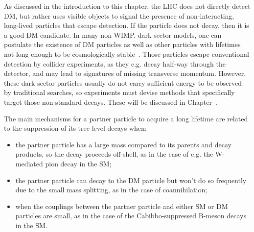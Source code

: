 As discussed in the introduction to this chapter, the LHC does not directly detect DM, but rather uses visible objects to signal the presence of non-interacting, long-lived particles that escape detection. If the particle does not decay, then it is a good DM candidate. In many non-WIMP, dark sector models, one can postulate the existence of DM particles as well as other particles with lifetimes not long enough to be cosmologically stable~\cite{Strassler:2006im}. Those particles escape conventional detection by collider experiments, as they e.g. decay half-way through the detector, and may lead to signatures of missing transverse momentum.
However, these dark sector particles usually do not carry sufficient energy to be observed by traditional searches, so experiments must devise methods that specifically target those non-standard decays. These will be discussed in Chapter~\cite{sec:03_ExperimentalResults}.

The main mechanisms for a partner particle to acquire a long lifetime are related to the suppression of its tree-level decays when:
\begin{itemize}
\item the partner particle has a large mass compared to its parents and decay products, so the decay proceeds off-shell, as in the case of e.g. the W-mediated pion decay in the SM;
\item the partner particle can decay to the DM particle but won't do so frequently due to the small mass splitting, as in the case of coannihilation;
\item when the couplings between the partner particle and either SM or DM particles are small, as in the case of the Cabibbo-suppressed B-meson decays in the SM. 
\end{itemize}

